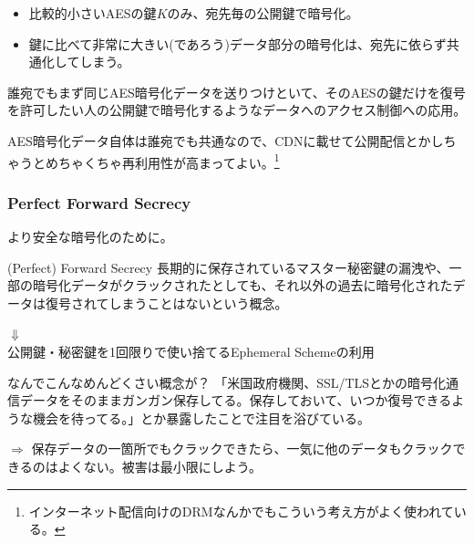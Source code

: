 \documentclass[12pt,dvipdfmx]{beamer}
\begin{document}
\begin{frame}
\begin{itemize}
 \item 比較的小さいAESの鍵$K$のみ、宛先毎の公開鍵で暗号化。
 \item 鍵に比べて非常に大きい(であろう)\alert{データ部分の暗号化は、宛先に依らず共通化}してしまう。
\end{itemize}

\begin{block}{}
誰宛でもまず同じAES暗号化データを送りつけといて、そのAESの鍵だけを復号を許可したい人の公開鍵で暗号化するようなデータへのアクセス制御への応用。
\end{block}

\begin{block}{}
AES暗号化データ自体は誰宛でも共通なので、CDNに載せて公開配信とかしちゃうとめちゃくちゃ再利用性が高まってよい。\footnote[frame]{\scriptsize インターネット配信向けのDRMなんかでもこういう考え方がよく使われている。}
\end{block}

\end{frame}

\begin{frame}
\frametitle{Perfect Forward Secrecy}
より安全な暗号化のために。

\begin{block}{\small (Perfect) Forward Secrecy}
長期的に保存されているマスター秘密鍵の漏洩や、一部の暗号化データがクラックされたとしても、\alert{それ以外の過去に暗号化されたデータは復号されてしまうことはない}という概念。
\end{block}

\begin{center}
$\Downarrow$\\[1ex]

公開鍵・秘密鍵を1回限りで使い捨てる\alert{Ephemeral Scheme}の利用
\end{center}

\end{frame}

\begin{frame}
\begin{block}{\small なんでこんなめんどくさい概念が？}
「米国政府機関、SSL/TLSとかの暗号化通信データをそのままガンガン保存してる。保存しておいて、いつか復号できるような機会を待ってる。」とか暴露したことで注目を浴びている。
\end{block}
$\Rightarrow$ 保存データの一箇所でもクラックできたら、一気に他のデータもクラックできるのはよくない。\alert{被害は最小限にしよう}。
\end{frame}
\end{document}
